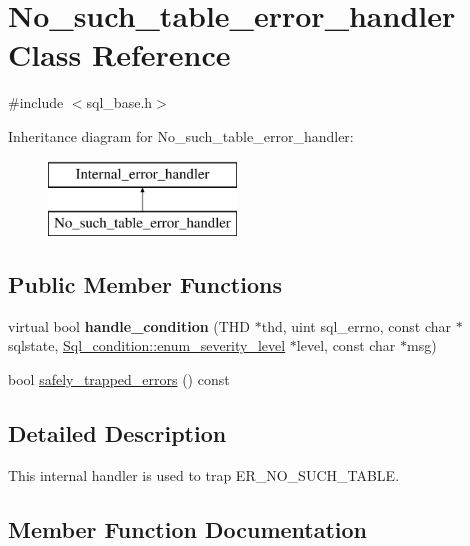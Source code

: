 \hypertarget{classNo__such__table__error__handler}{}\section{No\+\_\+such\+\_\+table\+\_\+error\+\_\+handler Class Reference}
\label{classNo__such__table__error__handler}


{\ttfamily \#include $<$sql\+\_\+base.\+h$>$}

Inheritance diagram for No\+\_\+such\+\_\+table\+\_\+error\+\_\+handler\+:\begin{figure}[H]
\begin{center}
\leavevmode
\includegraphics[height=2.000000cm]{classNo__such__table__error__handler}
\end{center}
\end{figure}
\subsection*{Public Member Functions}
\begin{DoxyCompactItemize}
\item 
\mbox{\label{classNo__such__table__error__handler_a4c25a6b90c5badcd1095e453908c17b1}} 
virtual bool {\bfseries handle\+\_\+condition} (T\+HD $\ast$thd, uint sql\+\_\+errno, const char $\ast$sqlstate, \mbox{\hyperlink{classSql__condition_ab0602581e19cddb609bfe10c44be4e83}{Sql\+\_\+condition\+::enum\+\_\+severity\+\_\+level}} $\ast$level, const char $\ast$msg)
\item 
bool \mbox{\hyperlink{classNo__such__table__error__handler_a3af685f8c1b13ac36e57de84651fad70}{safely\+\_\+trapped\+\_\+errors}} () const
\end{DoxyCompactItemize}


\subsection{Detailed Description}
This internal handler is used to trap E\+R\+\_\+\+N\+O\+\_\+\+S\+U\+C\+H\+\_\+\+T\+A\+B\+LE. 

\subsection{Member Function Documentation}
\mbox{\label{classNo__such__table__error__handler_a3af685f8c1b13ac36e57de84651fad70}} 
